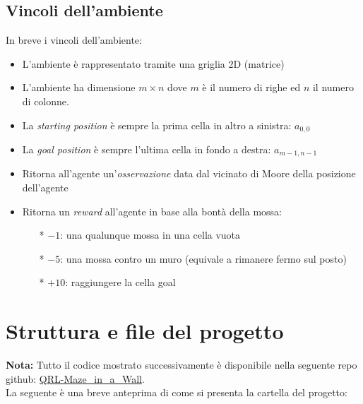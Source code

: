 \subsection{Vincoli dell'ambiente}
\label{sec:vincoliambiente}
In breve i vincoli dell'ambiente:

\begin{itemize}
	\item L'ambiente \`{e} rappresentato tramite una griglia 2D (matrice)
	\item L'ambiente ha dimensione $m \times n$ dove $m$ \`{e} il numero di righe ed $n$ il numero di colonne.
	\item La \textit{starting position} \`{e} sempre la prima cella in altro a sinistra: $a_{0,0}$
	\item La \textit{goal position} \`{e} sempre l'ultima cella in fondo a destra: $a_{m-1, n-1}$
	\item Ritorna all'agente un'\textit{osservazione} data dal vicinato di Moore della posizione dell'agente
	\item Ritorna un \textit{reward} all'agente in base alla bont\`{a} della mossa: 
		\begin{itemize}
			\item[*] $-1$: una qualunque mossa in una cella vuota
			\item[*] $-5$: una mossa contro un muro (equivale a rimanere fermo sul posto)
			\item[*] $+10$: raggiungere la cella goal
		\end{itemize}
\end{itemize}

\section{Struttura e file del progetto}
\label{sec:progetto}

\textbf{Nota:} Tutto il codice mostrato successivamente \`{e} disponibile nella seguente repo github: \href{https://github.com/ncvescera/QRL-Maze_in_a_Wall}{QRL-Maze\_in\_a\_Wall}.\\

La seguente \`{e} una breve anteprima di come si presenta la cartella del progetto:

